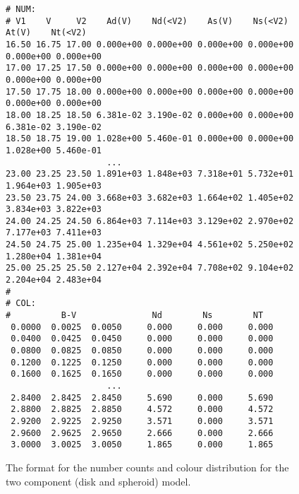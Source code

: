 \begin{figure}[p]
\begin{center}
\begin{verbatim}
# NUM:
# V1    V     V2    Ad(V)    Nd(<V2)    As(V)    Ns(<V2)    At(V)    Nt(<V2)
16.50 16.75 17.00 0.000e+00 0.000e+00 0.000e+00 0.000e+00 0.000e+00 0.000e+00
17.00 17.25 17.50 0.000e+00 0.000e+00 0.000e+00 0.000e+00 0.000e+00 0.000e+00
17.50 17.75 18.00 0.000e+00 0.000e+00 0.000e+00 0.000e+00 0.000e+00 0.000e+00
18.00 18.25 18.50 6.381e-02 3.190e-02 0.000e+00 0.000e+00 6.381e-02 3.190e-02
18.50 18.75 19.00 1.028e+00 5.460e-01 0.000e+00 0.000e+00 1.028e+00 5.460e-01
					...
23.00 23.25 23.50 1.891e+03 1.848e+03 7.318e+01 5.732e+01 1.964e+03 1.905e+03
23.50 23.75 24.00 3.668e+03 3.682e+03 1.664e+02 1.405e+02 3.834e+03 3.822e+03
24.00 24.25 24.50 6.864e+03 7.114e+03 3.129e+02 2.970e+02 7.177e+03 7.411e+03
24.50 24.75 25.00 1.235e+04 1.329e+04 4.561e+02 5.250e+02 1.280e+04 1.381e+04
25.00 25.25 25.50 2.127e+04 2.392e+04 7.708e+02 9.104e+02 2.204e+04 2.483e+04
#
# COL:
#          B-V               Nd        Ns        NT
 0.0000  0.0025  0.0050     0.000     0.000     0.000
 0.0400  0.0425  0.0450     0.000     0.000     0.000
 0.0800  0.0825  0.0850     0.000     0.000     0.000
 0.1200  0.1225  0.1250     0.000     0.000     0.000
 0.1600  0.1625  0.1650     0.000     0.000     0.000
					...
 2.8400  2.8425  2.8450     5.690     0.000     5.690
 2.8800  2.8825  2.8850     4.572     0.000     4.572
 2.9200  2.9225  2.9250     3.571     0.000     3.571
 2.9600  2.9625  2.9650     2.666     0.000     2.666
 3.0000  3.0025  3.0050     1.865     0.000     1.865
\end{verbatim}
\end{center}
\caption{The format for the number counts and colour distribution for the 
two component (disk and spheroid) model.}
\end{figure}

